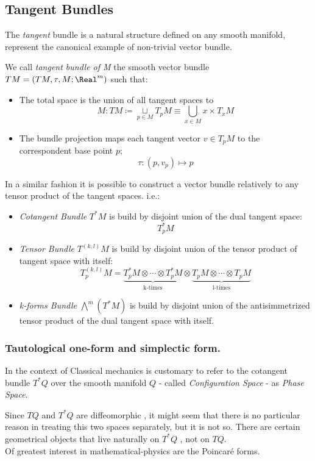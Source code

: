 \documentclass[Main]{subfiles}
\begin{document}
		\subsection{Tangent Bundles}
			The \emph{tangent} bundle is a natural structure defined on any smooth manifold, represent the canonical example of  non-trivial vector bundle.
						
			\begin{definition}
				We call \emph{tangent bundle of M} the smooth vector bundle $TM=(TM,\tau,M;\Real^m)$ such that:
				\begin{itemize}
					\item The total space is the union of all tangent spaces to 
						$$M: TM \coloneqq \underset{p \in M}{\sqcup} T_pM  \equiv \bigcup_{x\in M} {x}\times T_x M$$
					\item The bundle projection maps each tangent vector $v\in  T_pM$ to the correspondent base point  $p$;
						$$\tau : (p,v_p) \mapsto p $$
				\end{itemize}
			\end{definition}			
			
			\begin{observation}
				In a similar fashion it is possible to construct a vector bundle relatively to any tensor product of the tangent spaces.
				i.e.:
				\begin{itemize}
					\item \emph{Cotangent Bundle} $T^*M$ is build by disjoint union of the dual tangent space: 
					$$T_p^*M $$
					\item \emph{Tensor Bundle} $T^{(k,l)}M$ is build by disjoint union of the tensor product of tangent space with itself:
					\begin{displaymath}
						T^{(k,l)}_ p M = \underbrace{T^*_pM \otimes \cdots \otimes T^*_pM}_{\textrm{k-times}} \otimes
						\underbrace{T_pM \otimes \cdots \otimes T_pM}_{\textrm{l-times}}
					\end{displaymath}
					\item \emph{k-forms Bundle} $ \bigwedge^m( T^*M)$ is build by disjoint union of the antisimmetrized tensor product of the dual tangent space with itself.
				\end{itemize}
			\end{observation}
			
			
			\subsubsection{Tautological one-form and simplectic form.}
					\begin{notationfix}
						In the context of Classical mechanics is customary to refer to the cotangent bundle $T^*Q$ over the smooth manifold  $Q $ - called \emph{Configuration Space}  - as \emph{Phase Space}.
					\end{notationfix}
					Since $TQ$ and $T^*Q$ are diffeomorphic , it might seem that there is no particular reason in treating this two spaces separately, but it is not so.
					There are certain geometrical objects that live naturally on $T^*Q$ , not on $TQ$.\\
					Of greatest interest in mathematical-physics are the Poincaré forms\cite{Frankel2003}.
	
\end{document}
